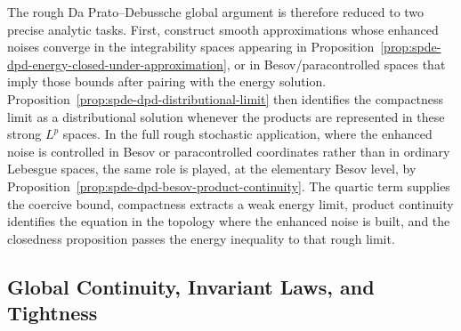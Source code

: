 The rough Da Prato--Debussche global argument is therefore reduced to two
precise analytic tasks.  First, construct smooth approximations whose
enhanced noises converge in the integrability spaces appearing in
Proposition~\ref{prop:spde-dpd-energy-closed-under-approximation}, or in
Besov/paracontrolled spaces that imply those bounds after pairing with the
energy solution.  Proposition~\ref{prop:spde-dpd-distributional-limit}
then identifies the compactness limit as a distributional solution whenever
the products are represented in these strong \(L^p\) spaces.  In the full
rough stochastic application, where the enhanced noise is controlled in
Besov or paracontrolled coordinates rather than in ordinary Lebesgue spaces,
the same role is played, at the elementary Besov level, by
Proposition~\ref{prop:spde-dpd-besov-product-continuity}.  The quartic
term supplies the coercive bound, compactness extracts a weak energy limit,
product continuity identifies the equation in the topology where the
enhanced noise is built, and the closedness proposition passes the energy
inequality to that rough limit.

\subsection{Global Continuity, Invariant Laws, and Tightness}
\label{subsec:spde-dpd-global-invariant-tightness}

